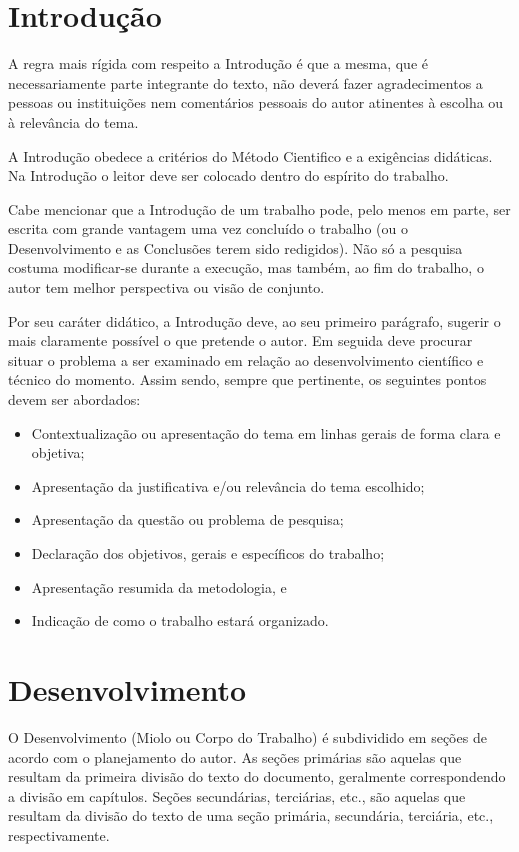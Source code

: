 \section{Introdução}

A regra mais rígida com respeito a Introdução é que a mesma, que é
necessariamente parte integrante do texto, não deverá fazer agradecimentos
a pessoas ou instituições nem comentários pessoais do autor atinentes à
escolha ou à relevância do tema.

A Introdução obedece a critérios do Método Cientifico e a exigências
didáticas. Na Introdução o leitor deve ser colocado dentro do espírito do
trabalho.

Cabe mencionar que a Introdução de um trabalho pode, pelo menos em parte,
ser escrita com grande vantagem uma vez concluído o trabalho (ou o
Desenvolvimento e as Conclusões terem sido redigidos). Não só a pesquisa
costuma modificar-se durante a execução, mas também, ao fim do trabalho, o
autor tem melhor perspectiva ou visão de conjunto.

Por seu caráter didático, a Introdução deve, ao seu primeiro parágrafo,
sugerir o mais claramente possível o que pretende o autor. Em seguida deve
procurar situar o problema a ser examinado em relação ao desenvolvimento
científico e técnico do momento. Assim sendo, sempre que pertinente, os
seguintes pontos devem ser abordados:

\begin{itemize}

	\item Contextualização ou apresentação do tema em linhas gerais de
	forma clara e objetiva;
	\item Apresentação da justificativa e/ou relevância do tema escolhido;
	\item Apresentação da questão ou problema de pesquisa;
	\item Declaração dos objetivos, gerais e específicos do trabalho;
	\item Apresentação resumida da metodologia, e
	\item Indicação de como o trabalho estará organizado.

\end{itemize}

\section{Desenvolvimento}

O Desenvolvimento (Miolo ou Corpo do Trabalho) é subdividido em seções de
acordo com o planejamento do autor. As seções primárias são aquelas que
resultam da primeira divisão do texto do documento, geralmente
correspondendo a divisão em capítulos. Seções secundárias, terciárias,
etc., são aquelas que resultam da divisão do texto de uma seção primária,
secundária, terciária, etc., respectivamente.

